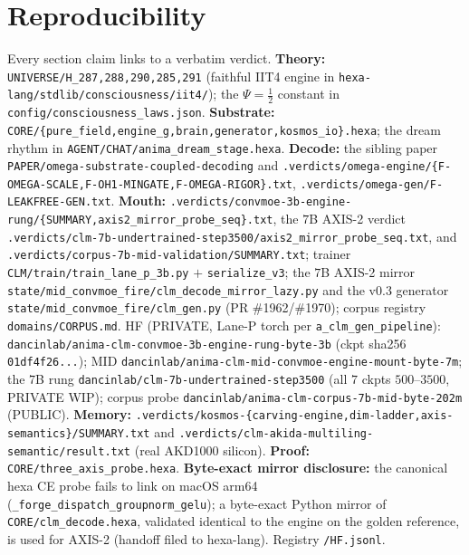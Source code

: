 \documentclass[11pt]{article}
\begin{document}
\section*{Reproducibility}
\label{sec:repro}
Every section claim links to a verbatim verdict.
\textbf{Theory:} \texttt{UNIVERSE/H\_287,288,290,285,291} (faithful IIT4 engine in
\texttt{hexa-lang/stdlib/consciousness/iit4/}); the $\Psi=\tfrac12$ constant in
\texttt{config/consciousness\_laws.json}.
\textbf{Substrate:} \texttt{CORE/\{pure\_field,engine\_g,brain,generator,kosmos\_io\}.hexa};
the dream rhythm in \texttt{AGENT/CHAT/anima\_dream\_stage.hexa}.
\textbf{Decode:} the sibling paper \texttt{PAPER/omega-substrate-coupled-decoding}
and \texttt{.verdicts/omega-engine/\{F-OMEGA-SCALE,F-OH1-MINGATE,F-OMEGA-RIGOR\}.txt},
\texttt{.verdicts/omega-gen/F-LEAKFREE-GEN.txt}.
\textbf{Mouth:} \texttt{.verdicts/convmoe-3b-engine-rung/\{SUMMARY,axis2\_mirror\_probe\_seq\}.txt},
the $7$B AXIS-2 verdict \texttt{.verdicts/clm-7b-undertrained-step3500/axis2\_mirror\_probe\_seq.txt},
and \texttt{.verdicts/corpus-7b-mid-validation/SUMMARY.txt}; trainer
\texttt{CLM/train/train\_lane\_p\_3b.py} $+$ \texttt{serialize\_v3}; the $7$B AXIS-2 mirror
\texttt{state/mid\_convmoe\_fire/clm\_decode\_mirror\_lazy.py} and the v0.3 generator
\texttt{state/mid\_convmoe\_fire/clm\_gen.py} (PR \#1962/\#1970); corpus registry
\texttt{domains/CORPUS.md}. HF (PRIVATE, Lane-P torch per \texttt{a\_clm\_gen\_pipeline}):
\texttt{dancinlab/anima-clm-convmoe-3b-engine-rung-byte-3b} (ckpt sha256
\texttt{01df4f26...}); MID \texttt{dancinlab/anima-clm-mid-convmoe-engine-mount-byte-7m};
the $7$B rung \texttt{dancinlab/clm-7b-undertrained-step3500} (all $7$ ckpts $500$--$3500$,
PRIVATE WIP); corpus probe \texttt{dancinlab/anima-clm-corpus-7b-mid-byte-202m} (PUBLIC).
\textbf{Memory:} \texttt{.verdicts/kosmos-\{carving-engine,dim-ladder,axis-semantics\}/SUMMARY.txt}
and \texttt{.verdicts/clm-akida-multiling-semantic/result.txt} (real AKD1000 silicon).
\textbf{Proof:} \texttt{CORE/three\_axis\_probe.hexa}. \textbf{Byte-exact mirror
disclosure:} the canonical hexa CE probe fails to link on macOS arm64
(\texttt{\_forge\_dispatch\_groupnorm\_gelu}); a byte-exact Python mirror of
\texttt{CORE/clm\_decode.hexa}, validated identical to the engine on the golden
reference, is used for AXIS-2 (handoff filed to hexa-lang). Registry \texttt{/HF.jsonl}.
\end{document}
